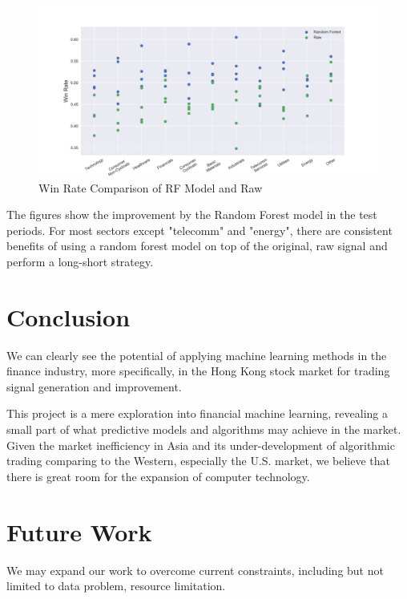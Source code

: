 \documentclass[12pt]{article}
\begin{document}
\begin{figure}[!ht]
  \begin{center}
    \includegraphics[width=1\linewidth]{figure/rf_raw_win_rate.png}
  \end{center}
  \caption{Win Rate Comparison of RF Model and Raw}
  \label{fig:rf_raw_win_rate}
\end{figure}

The figures show the improvement by the Random Forest model in the test periods. For most sectors except "telecomm" and "energy", there are consistent benefits of using a random forest model on top of the original, raw signal and perform a long-short strategy.

\section{Conclusion}

We can clearly see the potential of applying machine learning methods in the finance industry, more specifically, in the Hong Kong stock market for trading signal generation and improvement.

This project is a mere exploration into financial machine learning, revealing a small part of what predictive models and algorithms may achieve in the market. Given the market inefficiency in Asia and its under-development of algorithmic trading comparing to the Western, especially the U.S. market, we believe that there is great room for the expansion of computer technology.

\section{Future Work}

We may expand our work to overcome current constraints, including but not limited to data problem, resource limitation.
\end{document}
